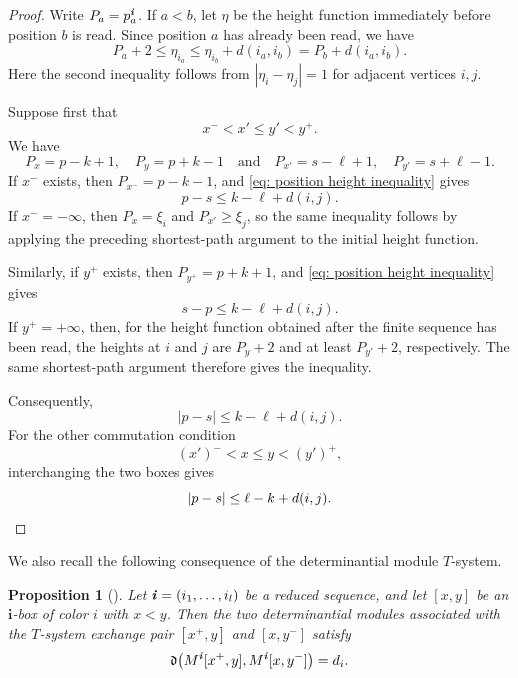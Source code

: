 \documentclass[12pt, leqno]{amsart}
\numberwithin{equation}{section}
\theoremstyle{plain}
\newtheorem{proposition}[lemma]{Proposition}
\theoremstyle{definition}
\newcommand{\de}{\mathfrak{d}}
\newcommand{\ii}{ \textbf{\textit{i}}}
\newcommand{\bfi}{\mathbf{i}}
\newcommand{\qtq}[1][{and}]{\quad\text{{#1}}\quad}
\begin{document}
\begin{proof}
 Write \(P_a=p_a^\ii\).
If \(a<b\), let \(\eta\) be the height function immediately
before position \(b\) is read.  Since position \(a\) has
already been read, we have
 \begin{equation}\label{eq: position height inequality}
P_a+2\leq\eta_{i_a}
\leq\eta_{i_b}+d(i_a,i_b)
=P_b+d(i_a,i_b).
\end{equation}
Here the second inequality follows from
\(|\eta_i-\eta_j|=1\) for adjacent vertices \(i,j\).

Suppose first that
\[
x^-<x'\leq y'<y^+.
\]
We have
\[
P_x=p-k+1,\quad P_y=p+k-1
\qtq{}
P_{x'}=s-\ell+1,\quad P_{y'}=s+\ell-1.
\]
 If \(x^-\) exists, then \(P_{x^-}=p-k-1\), and
\eqref{eq: position height inequality} gives
\[
p-s\leq k-\ell+d(i,j).
\] 
If \(x^-=-\infty\), then \(P_x=\xi_i\) and
\(P_{x'}\geq\xi_j\), so the same inequality follows by applying
the preceding shortest-path argument to the initial height function.

 Similarly, if \(y^+\) exists, then \(P_{y^+}=p+k+1\), and
\eqref{eq: position height inequality} gives
\[
s-p\leq k-\ell+d(i,j).
\]
If \(y^+=+\infty\), then, for the height function obtained after
the finite sequence has been read, the heights at \(i\) and \(j\)
are \(P_y+2\) and at least \(P_{y'}+2\), respectively.  The same
shortest-path argument therefore gives the inequality.

Consequently,
\[
|p-s|\leq k-\ell+d(i,j).
\]
For the other commutation condition
\[
(x')^-<x\leq y<(y')^+,
\]
interchanging the two boxes gives
\[
|p-s|\leq \ell-k+d(i,j). \qedhere
\]
\end{proof}

We also recall the following consequence of the determinantial
module \(T\)-system.

\begin{proposition}[{\cite[Lemma~5.18]{KK24}}]
\label{prop: t-system exchange pair d-value}
Let \(\ii=(i_1,\ldots,i_l)\) be a reduced sequence, and let
\([x,y]\) be an \(\bfi\)-box of color \(i\) with \(x<y\).  Then the
two determinantial modules associated with the \(T\)-system
exchange pair \([x^+,y]\) and \([x,y^-]\) satisfy
\[
\de\bigl(M^\ii[x^+,y],M^\ii[x,y^-]\bigr)=d_i.
\]
\end{proposition}
\end{document}
